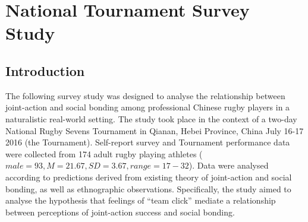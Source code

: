 %




%





\chapter{\label{tournamentSurvey}National Tournament Survey Study}


\section{Introduction}

The following survey study was designed to analyse the relationship between joint-action and social bonding among professional Chinese rugby players in a naturalistic real-world setting. The study took place in the context of a two-day National Rugby Sevens Tournament in Qianan, Hebei Province, China July 16-17 2016 (the Tournament).  Self-report survey and Tournament performance data were collected from 174 adult rugby playing athletes ($male = 93, M = 21.67, SD = 3.67, range = 17-32$). Data were analysed according to predictions derived from existing theory of joint-action and social bonding, as well as ethnographic observations. Specifically, the study aimed to analyse the hypothesis that feelings of ``team click'' mediate a relationship between perceptions of joint-action success and social bonding.

